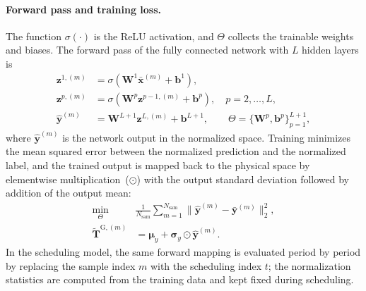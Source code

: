 \documentclass[letterpaper,journal]{IEEEtran}
\begin{document}
\paragraph{Forward pass and training loss.}
The function $\sigma(\cdot)$ is the ReLU activation, and $\Theta$ collects the trainable
weights and biases. The forward pass of the fully connected network with $L$ hidden layers
is
\begin{subequations}
\label{eq:supp_forward}
\begin{align}
\mathbf{z}^{1,(m)}
&=\sigma(\mathbf{W}^{1}\bar{\mathbf{x}}^{(m)}+\mathbf{b}^{1}),\\
\mathbf{z}^{p,(m)}
&=\sigma(\mathbf{W}^{p}\mathbf{z}^{p-1,(m)}+\mathbf{b}^{p}),\quad p=2,\ldots,L,\\
\hat{\mathbf{y}}^{(m)}
&=\mathbf{W}^{L+1}\mathbf{z}^{L,(m)}+\mathbf{b}^{L+1},\qquad
\Theta=\{\mathbf{W}^{p},\mathbf{b}^{p}\}_{p=1}^{L+1},
\end{align}
\end{subequations}
where $\hat{\mathbf{y}}^{(m)}$ is the network output in the normalized space. Training
minimizes the mean squared error between the normalized prediction and the normalized
label, and the trained output is mapped back to the physical space by elementwise
multiplication~($\odot$) with the output standard deviation followed by addition of the
output mean:
\begin{subequations}
\label{eq:supp_loss_recovery}
\begin{align}
\min_{\Theta}\;&\frac{1}{N_{\mathrm{sam}}}
\sum_{m=1}^{N_{\mathrm{sam}}}
\|\hat{\mathbf{y}}^{(m)}-\bar{\mathbf{y}}^{(m)}\|_2^2,\\
\widetilde{\mathbf{T}}^{\mathrm{G},(m)}
&=\boldsymbol{\mu}_y+\boldsymbol{\sigma}_y\odot\hat{\mathbf{y}}^{(m)}.
\end{align}
\end{subequations}
In the scheduling model, the same forward mapping is evaluated period by period by replacing
the sample index $m$ with the scheduling index $t$; the normalization statistics are
computed from the training data and kept fixed during scheduling.
\end{document}
